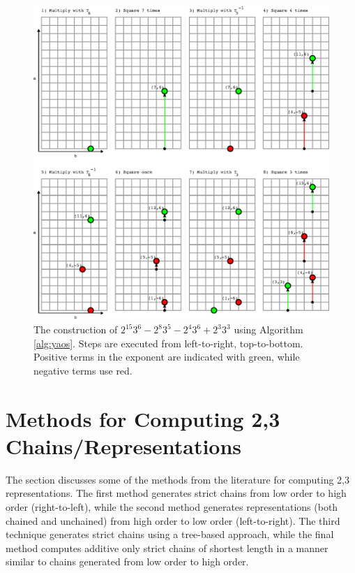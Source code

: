 \documentclass{ucalgthes1}
\theoremstyle{definition}
\begin{document}
\begin{figure}[H]
\centering
\includegraphics{yao1}
\caption[The construction of $2^{15} 3^6 - 2^8 3^5 - 2^4 3^6 + 2^3 3^3$.]{The construction of $2^{15} 3^6 - 2^8 3^5 - 2^4 3^6 + 2^3 3^3$ using Algorithm \ref{alg:yaos}.  Steps are executed from left-to-right, top-to-bottom.  Positive terms in the exponent are indicated with green, while negative terms use red.}
\label{fig:yao1}
\end{figure}


\section{Methods for Computing 2,3 Chains/Representations}
\label{sec:dbnsMethods}

The section discusses some of the methods from the literature for computing 2,3 representations. The first method generates strict chains from low order to high order (right-to-left), while the second method generates representations (both chained and unchained) from high order to low order (left-to-right).  The third technique generates strict chains using a tree-based approach, while the final method computes additive only strict chains of shortest length in a manner similar to chains generated from low order to high order.  
\end{document}
